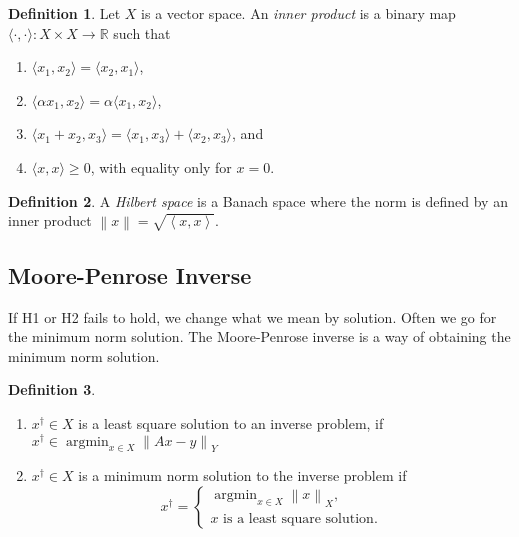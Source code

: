 \documentclass[12pt]{article}
\theoremstyle{definition}
\newtheorem{definition}{Definition}[section]
\newcommand{\real}{\mathbb{R}}   %
\DeclareMathOperator{\argmin}{argmin}
\newcommand\norm[1]{\left\lVert#1\right\rVert}
\newcommand\inner[2]{\left\langle#1, #2\right\rangle}
\begin{document}
\begin{definition}
    Let $X$ is a vector space. An \textit{inner product} is a binary map $\langle\cdot,\cdot\rangle: X\times X \to \real$ such that
    \begin{enumerate}[label=(\alph*)]
        \item $\langle x_1,x_2\rangle = \langle x_2,x_1\rangle$,
        \item $\langle\alpha x_1,x_2\rangle = \alpha\langle x_1,x_2\rangle$,
        \item $\langle x_1+x_2,x_3\rangle = \langle x_1,x_3\rangle+\langle x_2,x_3\rangle$, and
        \item $\langle x,x\rangle \geq 0$, with equality only for $x=0$.
    \end{enumerate}
\end{definition}

\begin{definition}
    A \textit{Hilbert space} is a Banach space where the norm is defined by an inner product $\norm{x} = \sqrt{\inner{x}{x}}$.
\end{definition}

\subsection{Moore-Penrose Inverse}
If H1 or H2 fails to hold, we change what we mean by solution. Often we go for the minimum norm solution. The Moore-Penrose inverse is a way of obtaining the minimum norm solution.

\begin{definition}
    \begin{enumerate}[label=(\alph*)]
        \item $x^\dagger \in X$ is a least square solution to an inverse problem, if $x^\dagger \in \argmin_{x\in X} \norm{Ax-y}_Y$
        \item $x^\dagger \in X$ is a minimum norm solution to the inverse problem if 
        \begin{equation*}
            x^\dagger =\begin{cases}
                \argmin_{x\in X} \norm{x}_X,\\
                x \text{ is a least square solution}.
            \end{cases}
        \end{equation*}
    \end{enumerate}
\end{definition}
\end{document}
